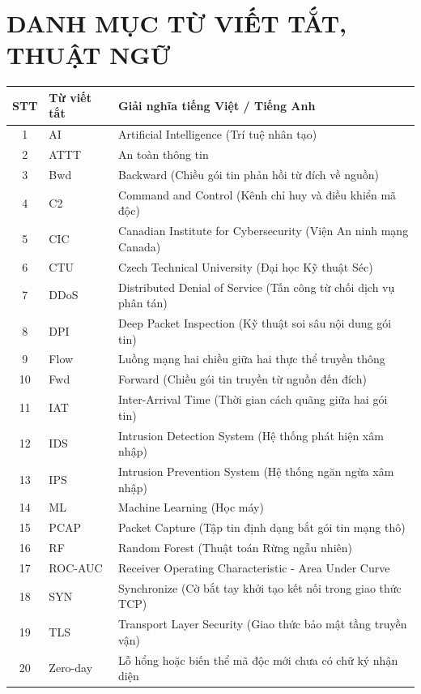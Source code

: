 \documentclass[12pt,a4paper,oneside]{report}
\begin{document}
\newpage
{}
\tableofcontents

\newpage
\chapter*{DANH MỤC TỪ VIẾT TẮT, THUẬT NGỮ}
\begin{table}[h]
\centering
\begin{tabular}{|c|l|p{8.5cm}|}
\hline
\textbf{STT} & \textbf{Từ viết tắt} & \textbf{Giải nghĩa tiếng Việt / Tiếng Anh} \\ \hline
1 & AI & Artificial Intelligence (Trí tuệ nhân tạo) \\ \hline
2 & ATTT & An toàn thông tin \\ \hline
3 & Bwd & Backward (Chiều gói tin phản hồi từ đích về nguồn) \\ \hline
4 & C2 & Command and Control (Kênh chỉ huy và điều khiển mã độc) \\ \hline
5 & CIC & Canadian Institute for Cybersecurity (Viện An ninh mạng Canada) \\ \hline
6 & CTU & Czech Technical University (Đại học Kỹ thuật Séc) \\ \hline
7 & DDoS & Distributed Denial of Service (Tấn công từ chối dịch vụ phân tán) \\ \hline
8 & DPI & Deep Packet Inspection (Kỹ thuật soi sâu nội dung gói tin) \\ \hline
9 & Flow & Luồng mạng hai chiều giữa hai thực thể truyền thông \\ \hline
10 & Fwd & Forward (Chiều gói tin truyền từ nguồn đến đích) \\ \hline
11 & IAT & Inter-Arrival Time (Thời gian cách quãng giữa hai gói tin) \\ \hline
12 & IDS & Intrusion Detection System (Hệ thống phát hiện xâm nhập) \\ \hline
13 & IPS & Intrusion Prevention System (Hệ thống ngăn ngừa xâm nhập) \\ \hline
14 & ML & Machine Learning (Học máy) \\ \hline
15 & PCAP & Packet Capture (Tập tin định dạng bắt gói tin mạng thô) \\ \hline
16 & RF & Random Forest (Thuật toán Rừng ngẫu nhiên) \\ \hline
17 & ROC-AUC & Receiver Operating Characteristic - Area Under Curve \\ \hline
18 & SYN & Synchronize (Cờ bắt tay khởi tạo kết nối trong giao thức TCP) \\ \hline
19 & TLS & Transport Layer Security (Giao thức bảo mật tầng truyền vận) \\ \hline
20 & Zero-day & Lỗ hổng hoặc biến thể mã độc mới chưa có chữ ký nhận diện \\ \hline
\end{tabular}
\end{table}
\end{document}
